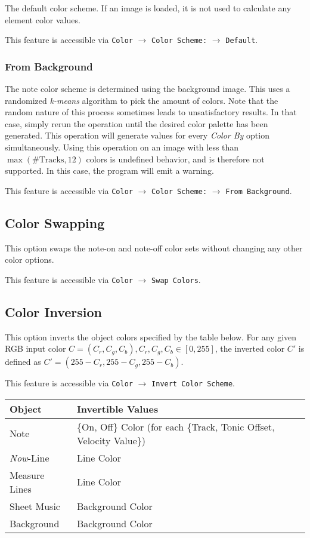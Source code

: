 \documentclass[english]{article}
\makeatletter
\newenvironment{restoretext}%
    {\@parboxrestore%
     \begin{adjustwidth}{}{\leftmargin}%
    }{\end{adjustwidth}
     }
\def\rcbegin{\begin{restoretext}\centering}
\def\rcend{\end{restoretext}}
\providecommand{\mi}[1]{\texttt{#1}}
\makeatother
\begin{document}
The default color scheme. If an image is loaded, it is not used to calculate any element color values.

This feature is accessible via 
\mi{Color} $\rightarrow$ \mi{Color Scheme:} $\rightarrow$ \mi{Default}.

\subsubsection{From Background}

The note color scheme is determined using the background image. This uses a randomized \textit{k-means} algorithm
to pick the amount of colors. Note that the random nature of this process sometimes leads to unsatisfactory results.
In that case, simply rerun the operation until the desired color palette has been generated. This operation will
generate values for every \textit{Color By} option simultaneously. Using this operation on an image with less
than $\max(\text{\# Tracks}, 12)$ colors is undefined behavior, and is therefore not supported. In this case,
the program will emit a warning.

This feature is accessible via 
\mi{Color} $\rightarrow$ \mi{Color Scheme:} $\rightarrow$ \mi{From Background}.

\subsection{Color Swapping}

This option swaps the note-on and note-off color sets without changing any other color options.

This feature is accessible via 
\mi{Color} $\rightarrow$ \mi{Swap Colors}.

\subsection{Color Inversion}

This option inverts the object colors specified by the table below. For any given RGB input color 
$C= (C_r,C_g,C_b), C_r,C_g,C_b \in [0,255]$, the inverted color $C'$ is defined as 
$C' = (255-C_r, 255-C_g, 255-C_b)$.

This feature is accessible via 
\mi{Color} $\rightarrow$ \mi{Invert Color Scheme}.

\vspace{1em}

\rcbegin
\begin{tabular}{|l|l|}
  \hline
  \textbf{Object}         & \textbf{Invertible Values} \\
  \hline
  Note                    & \{On, Off\} Color (for each \{Track, Tonic Offset, Velocity Value\})\\
  \textit{Now}-Line       & Line Color \\
  Measure Lines           & Line Color \\
  Sheet Music             & Background Color \\
  Background              & Background Color \\
  \hline
\end{tabular}
\rcend
\end{document}
